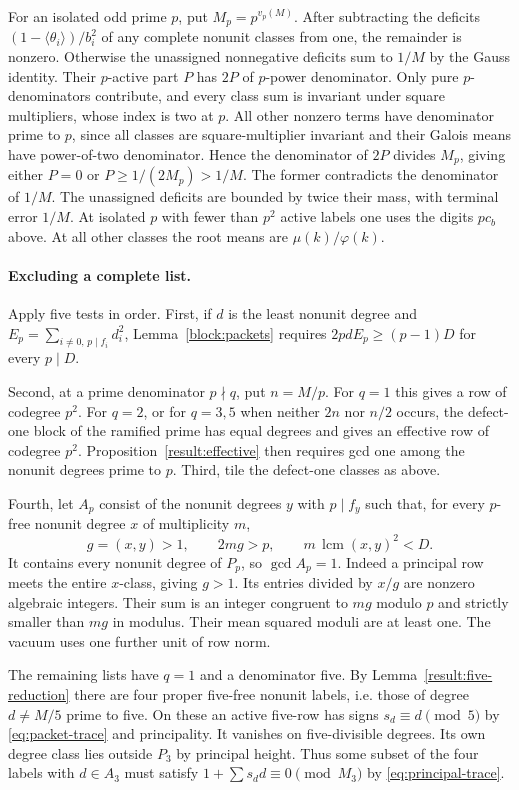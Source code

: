 \documentclass[11pt]{amsart}
\numberwithin{equation}{section}
\theoremstyle{definition}
\theoremstyle{plain}
\DeclareMathOperator{\lcm}{lcm}
\begin{document}
For an isolated odd prime $p$, put
$M_p=p^{v_p(M)}$. After subtracting the deficits
$(1-\langle\theta_i\rangle)/b_i^2$ of any complete nonunit classes
from one, the remainder is nonzero. Otherwise the unassigned
nonnegative deficits sum to $1/M$ by the Gauss identity.
Their $p$-active part $P$ has $2P$ of $p$-power denominator. Only
pure $p$-denominators contribute, and every class sum is invariant
under square multipliers, whose index is two at $p$. All other
nonzero terms have denominator prime to $p$, since all classes are
square-multiplier invariant and their Galois means have
power-of-two denominator. Hence the denominator of $2P$ divides
$M_p$, giving either $P=0$ or $P\ge1/(2M_p)>1/M$.
The former contradicts the denominator of $1/M$. The unassigned
deficits are bounded by twice their mass, with terminal error $1/M$.
At isolated $p$ with fewer than $p^2$ active labels one uses
the digits $pc_b$ above. At all other classes the root means are
$\mu(k)/\varphi(k)$.

\paragraph{Excluding a complete list.}
Apply five tests in order. First, if $d$ is the least nonunit degree and
$E_p=\sum_{i\ne0,\,p\mid f_i}d_i^2$, Lemma~\ref{block:packets} requires
$2pdE_p\ge(p-1)D$ for every $p\mid D$.

Second, at a prime denominator $p\nmid q$, put $n=M/p$. For $q=1$ this
gives a row of codegree $p^2$. For $q=2$, or for $q=3,5$ when neither
$2n$ nor $n/2$ occurs, the defect-one block of the ramified prime has
equal degrees and gives an effective row of codegree $p^2$.
Proposition~\ref{result:effective} then requires gcd one
among the nonunit degrees prime to $p$.
Third, tile the defect-one classes as above.

Fourth, let $A_p$ consist of the nonunit degrees $y$ with $p\mid f_y$ such
that, for every $p$-free nonunit degree $x$ of multiplicity $m$,
\[
 g=(x,y)>1,\qquad 2mg>p,\qquad m\,\lcm(x,y)^2<D .
\]
It contains every nonunit degree of $P_p$, so $\gcd A_p=1$.
Indeed a principal row meets the entire $x$-class, giving $g>1$.
Its entries divided by $x/g$ are nonzero algebraic integers.
Their sum is an integer congruent to $mg$ modulo $p$ and strictly
smaller than $mg$ in modulus. Their mean squared moduli are at
least one. The vacuum uses one further unit of row norm.

The remaining lists have $q=1$ and a denominator five. By
Lemma~\ref{result:five-reduction} there are four proper five-free
nonunit labels, i.e. those of degree $d\ne M/5$ prime to five.
On these an active five-row has signs $s_d\equiv d\pmod5$
by \eqref{eq:packet-trace} and principality. It vanishes on
five-divisible degrees. Its own degree class lies outside $P_3$
by principal height. Thus some subset of the four labels with
$d\in A_3$ must satisfy $1+\sum s_d d\equiv0\pmod{M_3}$
by \eqref{eq:principal-trace}.
\end{document}
